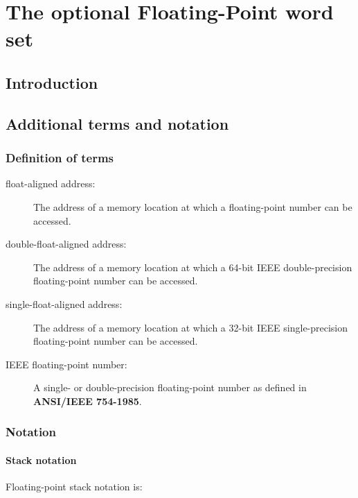 \chapter{The optional Floating-Point word set} %

\section{Introduction} %

\section{Additional terms and notation} %

\subsection{Definition of terms} %
\label{float:terms}

\begin{description}
\item[float-aligned address:]
	The address of a memory location at which a floating-point
	number can be accessed.

\item[double-float-aligned address:]
	The address of a memory location at which a 64-bit IEEE
	double-precision floating-point number can be accessed.

\item[single-float-aligned address:]
	The address of a memory location at which a 32-bit IEEE
	single-precision floating-point number can be accessed.

\item[IEEE floating-point number:]
	A single- or double-precision floating-point number as defined
	in \linebreak \textbf{ANSI/IEEE 754-1985}.
\end{description}

\subsection{Notation} %
\label{float:notation}

\subsubsection{Stack notation} %

Floating-point stack notation is:
\begin{quote}
\end{quote}

